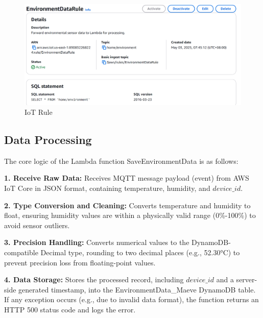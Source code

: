 \documentclass[12pt,a4paper]{article}
\begin{document}
\begin{figure}[h!]
    \centering
    \includegraphics[width=0.95\linewidth]{figures/rule.png}
    \caption{IoT Rule}
\end{figure}



\subsection{Data Processing}
The core logic of the Lambda function SaveEnvironmentData is as follows:

\vspace{\baselineskip}
\noindent
\textbf{1. Receive Raw Data:} Receives MQTT message payload (event) from AWS IoT Core in JSON format, containing temperature, humidity, and $device\_id$.

\vspace{\baselineskip}
\noindent
\textbf{2. Type Conversion and Cleaning:} Converts temperature and humidity to float, ensuring humidity values are within a physically valid range (0\%-100\%) to avoid sensor outliers.

\vspace{\baselineskip}
\noindent
\textbf{3. Precision Handling:} Converts numerical values to the DynamoDB-compatible Decimal type, rounding to two decimal places (e.g., 52.30°C) to prevent precision loss from floating-point values.

\vspace{\baselineskip}
\noindent
\textbf{4. Data Storage:} Stores the processed record, including $device\_id$ and a server-side generated timestamp, into the EnvironmentData\_Maeve DynamoDB table. If any exception occurs (e.g., due to invalid data format), the function returns an HTTP 500 status code and logs the error.
\end{document}
